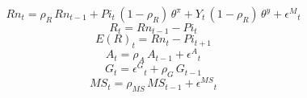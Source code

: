 \begin{dmath}
{Rn}_{t}={{\rho_{R}}}\, {Rn}_{t-1}+{Pi}_{t}\, \left(1-{{\rho_{R}}}\right)\, {\theta^{\pi}}+{Y}_{t}\, \left(1-{{\rho_{R}}}\right)\, {\theta^{y}}+{{\epsilon^{M}}}_{t}
\end{dmath}
\begin{dmath}
{R}_{t}={Rn}_{t-1}-{Pi}_{t}
\end{dmath}
\begin{dmath}
{E(R)}_{t}={Rn}_{t}-{Pi}_{t+1}
\end{dmath}
\begin{dmath}
{A}_{t}={{\rho_{A}}}\, {A}_{t-1}+{{\epsilon^{A}}}_{t}
\end{dmath}
\begin{dmath}
{G}_{t}={{\epsilon^{G}}}_{t}+{{\rho_{G}}}\, {G}_{t-1}
\end{dmath}
\begin{dmath}
{MS}_{t}={{\rho_{MS}}}\, {MS}_{t-1}+{{\epsilon^{MS}}}_{t}
\end{dmath}

